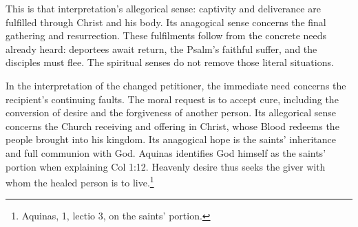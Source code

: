This is that interpretation's allegorical sense: captivity and
deliverance are fulfilled through Christ and his body. Its
anagogical sense concerns the final gathering and resurrection.
These fulfilments follow from the concrete needs already heard:
deportees await return, the Psalm's faithful suffer, and the
disciples must flee. The spiritual senses do not remove those
literal situations.

In the interpretation of the changed petitioner, the immediate
need concerns the recipient's continuing faults. The moral request
is to accept cure, including the conversion of desire and the
forgiveness of another person. Its allegorical sense concerns the
Church receiving and offering in Christ, whose Blood redeems the
people brought into his kingdom. Its anagogical hope is the
saints' inheritance and full communion with God. Aquinas identifies
God himself as the saints' portion when explaining Col 1:12.
Heavenly desire thus seeks the giver with whom the healed person
is to live.\footnote{Aquinas,  1, lectio 3,
on the saints' portion.}
